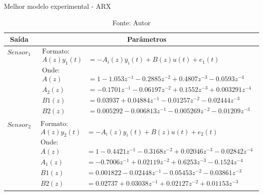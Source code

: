 \begin{table}[h]
	\centering
	\caption{Melhor modelo experimental - ARX}
	\label{tab:tclabsp-model-arx}
	\begin{tabular}{c|c} \toprule
		{Saída}			&	{Parâmetros}									\\ \midrule
		$Sensor_1$			&
								$ 
									\begin{aligned}
										\text{Formato:}																	\\
										A(z)y_1(t) &= - A_i(z)y_i(t) + B(z)u(t) + e_1(t)								\\
										\text{Onde:}																	\\
										A(z) &= 1 - 1.053 z^{-1} - 0.2885 z^{-2} + 0.4807 z^{-3} - 0.0593 z^{-4}		\\
										A_2(z) &= -0.1701 z^{-1} - 0.06197 z^{-2} + 0.1552 z^{-3} + 0.003291 z^{-4}		\\ 	 
										B1(z) &= 0.03937 + 0.04884 z^{-1} - 0.01257 z^{-2} - 0.02444 z^{-3}				\\	 
										B2(z) &= 0.005292 - 0.006813 z^{-1} - 0.005269 z^{-2} - 0.01209 z^{-3}   
									\end{aligned}
								$	
							\\ \midrule
		$Sensor_2$			&
								$ 
									\begin{aligned}
										\text{Formato:}																	\\
										A(z)y_2(t) &= - A_i(z)y_i(t) + B(z)u(t) + e_2(t)									\\
										\text{Onde:}																	\\
										A(z) &= 1 - 0.4421 z^{-1} - 0.3168 z^{-2} + 0.02046 z^{-3} - 0.02842 z^{-4}      \\ 
										A_1(z) &= -0.7006 z^{-1} + 0.02119 z^{-2} + 0.6253 z^{-3} - 0.1524 z^{-4}     	\\ 
										B1(z) &= 0.001822 - 0.02448 z^{-1} - 0.05453 z^{-2} - 0.03861 z^{-3}        	 	\\
										B2(z) &= 0.02737 + 0.03038 z^{-1} + 0.02127 z^{-2} + 0.01153 z^{-3}    			
									\end{aligned}
								$
							\\ \bottomrule
	\end{tabular}
	\caption*{Fonte: Autor}
\end{table}

